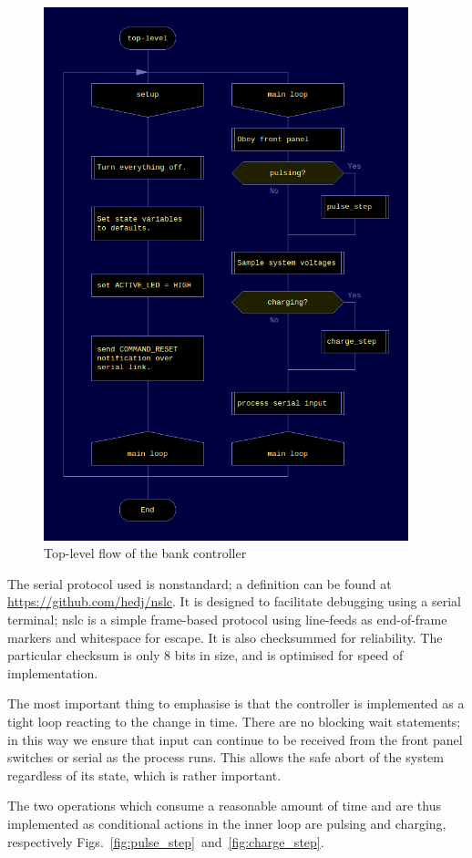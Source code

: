 \begin{figure}
  \includegraphics[width=400px]{top_level.png}
\caption{\label{fig:toplevelbank} Top-level flow of the bank controller}
\end{figure}

The serial protocol used is nonstandard; a definition can be found at \url{https://github.com/hedj/nslc}.  It is designed to facilitate debugging using a serial terminal; nslc is a simple frame-based protocol using line-feeds as end-of-frame markers and whitespace for escape. It is also checksummed for reliability. The particular checksum is only 8 bits in size, and is optimised for speed of implementation.

The most important thing to emphasise is that the controller is implemented as a tight loop reacting to the change in time. There are no blocking wait statements; in this way we ensure that input can continue to be received from the front panel switches or serial as the process runs. This allows the safe abort of the system regardless of its state, which is rather important.

The two operations which consume a reasonable amount of time and are thus implemented as conditional actions in the inner loop are pulsing and charging, respectively Figs.~\ref{fig:pulse_step}~and~\ref{fig:charge_step}.

